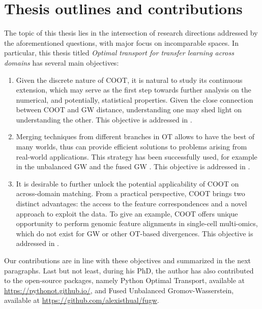 \section{Thesis outlines and contributions}

The topic of this thesis lies in the intersection of research directions addressed
by the aforementioned questions, with major focus on incomparable spaces.
In particular, this thesis titled
\textit{Optimal transport for transfer learning across domains} has several main objectives:
\begin{enumerate}
    \item Given the discrete nature of COOT, it is natural to study
    its continuous extension, which may serve as the first step towards further analysis
    on the numerical, and potentially, statistical properties. Given the close connection between
    COOT and GW distance, understanding one may shed light on understanding the other.
    This objective is addressed in .

    \item Merging techniques from different branches in OT allows to have the best of many worlds,
    thus can provide efficient solutions to problems arising from real-world applications.
    This strategy has been successfully used,
    for example in the unbalanced GW \citep{Sejourne20} and the fused GW \citep{Vayer19b}.
    This objective is addressed in .

    \item It is desirable to further unlock the potential applicability of COOT
    on across-domain matching. From a practical perspective, COOT brings two distinct advantages:
    the access to the feature correspondences and a novel approach to exploit the data.
    To give an example, COOT offers unique opportunity to perform genomic feature alignments
    in single-cell multi-omics, which do not exist for GW or other OT-based divergences.
    This objective is addressed in .
\end{enumerate}
Our contributions are in line with these objectives and summarized in the next paragraphs.
Last but not least, during his PhD, the author has also contributed to the open-source packages,
namely Python Optimal Transport, available at \url{https://pythonot.github.io/}, and
Fused Unbalanced Gromov-Wasserstein, available at \url{https://github.com/alexisthual/fugw}.

